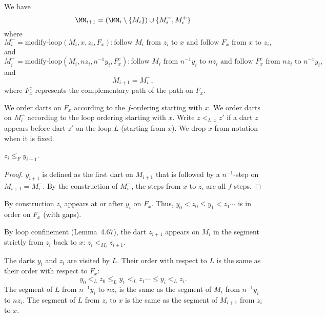 \begin{lemma} 
We have 
\[
\MM_{i+1} = (\MM_i \setminus \{M_i\}) \cup \{M_i^-,M_i^+\}
\]
where 
\[
M_i^- = \text{modify-loop} (M_i,x,z_i,F_x): 
  \text{follow } M_i \text{ from } z_i \text{ to } x
  \text{ and follow } F_x \text{ from } x \text{ to } z_i,
\]
and
\[
M_i^+ = \text{modify-loop} (M_i,nz_i,n^{-1}y_i,F^c_x): 
\text{follow } M_i \text{ from } n^{-1} y_i \text{ to } n z_i
  \text{ and follow } F^c_x \text{ from } nz_i \text{ to } n^{-1} y_i,
\]
and 
\[
M_{i+1} = M_i^-,
\]
where $F^c_x$ represents the complementary path of the path on $F_x$.
\end{lemma} 

We order darts on $F_x$ according to the $f$-ordering starting with $x$.
We order darts on $M_i^-$ 
according to the loop ordering starting with $x$.
Write $z <_{L,x} z'$ if a dart $z$ appears before dart $z'$ on the loop $L$
(starting from $x$).  We drop $x$ from notation when it is fixed.

\begin{lemma}  $z_i \le _F y_{i+1}$.
\end{lemma} 

\begin{proof} $y_{i+1}$ is defined as the first dart on $M_{i+1}$
that is followed by a $n^{-1}$-step on $M_{i+1} = M_i^-$.  By the
construction of $M_i^-$,
the steps from $x$ to $z_i$ are all $f$-steps.
\end{proof}

By construction $z_i$ appears at or after $y_i$ on $F_x$.  Thus,
$y_0 < z_0 \le y_1 < z_1\cdots$ is in order on $F_x$ (with gaps).

By loop confinement (Lemma~4.67), the dart $z_{i+1}$ appears on
$M_i$ in the segment strictly from $z_i$ back to $x$:
$z_i <_{M_i} z_{i+1}$.

\begin{lemma} 
The darts $y_i$ and $z_i$ are visited by $L$.  Their order with
respect to $L$ is the same as their order with respect to $F_x$:
\[
y_0 <_L z_0 \le_L y_1 <_L z_1\cdots \le y_i <_L z_i.
\]
The segment of $L$ from $n^{-1} y_i$ to $n z_i$ is the same
as the segment of $M_i$ from $n^{-1}y_i$ to $n z_i$.
The segment of $L$ from $z_i$ to $x$ is the same as the
segment of $M_{i+1}$ from $z_i$ to $x$.
\end{lemma} 

